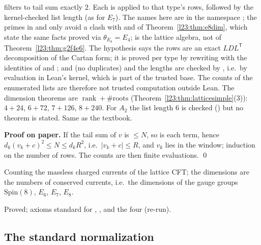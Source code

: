 \begin{dictionary}
 filters  to tail sum exactly $2$. Each  is  applied to
that type's rows, followed by the kernel-checked list length (as  for $E_7$). The names here are in the namespace
; the primes in  and  only avoid a clash with
 and  of Theorem~\ref{l23:thm:e8dim}, which state the same facts proved via
$\theta_{E_8}=E_4$;  is the lattice algebra, not  of Theorem~\ref{l23:thm:g2f4e6}. The hypothesis  says the rows are an exact
$LDL^{\mathsf T}$ decomposition of the Cartan form; it is proved per type by rewriting with the  identities of
 and ;  and  (no duplicates) and the lengths are checked by
, i.e.\ by evaluation in Lean's kernel, which is part of the trusted base. The counts of the enumerated lists are
therefore not trusted computation outside Lean. The dimension theorems are $\operatorname{rank}+\#\text{roots}$
(Theorem~\ref{l23:thm:latticesimple}(3)): $4+24$, $6+72$, $7+126$, $8+240$. For $A_2$ the list length $6$ is checked
() but no theorem  is stated. Same as the textbook.
\end{dictionary}

\textbf{Proof on paper.} If the tail sum of $v$ is $\le N$, so is each term, hence
$d_k(v_k+c)^2\le N\le d_kR^2$, i.e.\ $|v_k+c|\le R$, and $v_k$ lies in the window; induction on the number of rows. The counts are then
finite evaluations. \qed

\begin{physics}
Counting the massless charged currents of the lattice CFT; the dimensions are the numbers of conserved currents, i.e.\ the dimensions of
the gauge groups $\mathrm{Spin}(8)$, $E_6$, $E_7$, $E_8$.
\end{physics}

\begin{status}
Proved; axioms standard for , ,  and the four 
(re-run).
\end{status}

\subsection{The standard normalization}

